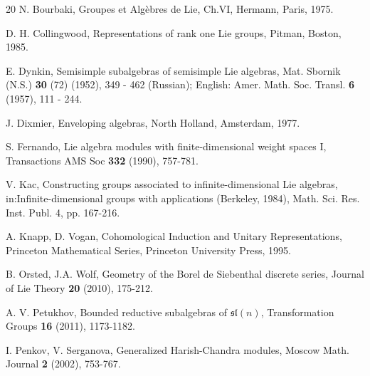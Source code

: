 \documentclass[10pt]{amsart}
\renewcommand{\sl}{\mathfrak{sl}}
\begin{document}
\begin{thebibliography}{20}
 N. Bourbaki, Groupes et Alg\`{e}bres de Lie, Ch.VI, Hermann, Paris, 1975.

\vspace{.25cm}

 D. H. Collingwood, Representations of rank one Lie groups, Pitman, Boston, 1985.

\vspace{.25cm}

 E. Dynkin, Semisimple subalgebras of semisimple Lie algebras, Mat. Sbornik (N.S.) \textbf{30} (72) (1952), 349 - 462 (Russian); English: Amer. Math. Soc. Transl. \textbf{6} (1957), 111 - 244.

\vspace{.25cm}

 J. Dixmier, Enveloping algebras, North Holland, Amsterdam, 1977.

\vspace{.25cm}

 S. Fernando, Lie algebra modules with finite-dimensional weight spaces I, Transactions AMS Soc \textbf{332} (1990), 757-781.

\vspace{.25cm}

 V. Kac, Constructing groups associated to infinite-dimensional Lie algebras, in:Infinite-dimensional groups with applications (Berkeley, 1984), Math. Sci. Res. Inst. Publ. 4, pp. 167-216.

\vspace{.25cm}

 A. Knapp, D. Vogan, Cohomological Induction and Unitary Representations, Princeton Mathematical Series, Princeton University Press, 1995.

\vspace{.25cm}

 B. Orsted, J.A. Wolf, Geometry of the Borel de Siebenthal discrete series, Journal of Lie Theory \textbf{20} (2010), 175-212.

\vspace{.25cm}

 A. V. Petukhov, Bounded reductive subalgebras of $\sl(n)$, Transformation Groups \textbf{16} (2011), 1173-1182. 

\vspace{.25cm}

 I. Penkov, V. Serganova, Generalized Harish-Chandra modules, Moscow Math. Journal \textbf{2} (2002), 753-767.


\end{thebibliography}
\end{document}
